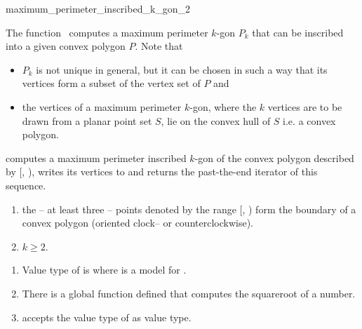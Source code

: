 \begin{ccRefFunction}{maximum_perimeter_inscribed_k_gon_2}
  
  \ccDefinition The function \ccRefName\ computes a maximum perimeter
  $k$-gon $P_k$ that can be inscribed into a given convex polygon $P$.
  Note that
  \begin{itemize}
  \item $P_k$ is not unique in general, but it can be chosen in such a
    way that its vertices form a subset of the vertex set of $P$ and
  \item the vertices of a maximum perimeter $k$-gon, where the $k$
    vertices are to be drawn from a planar point set $S$, lie on the
    convex hull of $S$ i.e. a convex polygon.
  \end{itemize}


  \def\ccLongParamLayout{\ccTrue}
  
  computes a maximum perimeter inscribed $k$-gon of the convex polygon
  described by [, ), writes its
  vertices to  and returns the past-the-end iterator of this
  sequence.

  \ccPrecond
  \begin{enumerate}
  \item the -- at least three -- points denoted by the range
    [, ) form the boundary of a
    convex polygon (oriented clock-- or counterclockwise).
  \item $k \ge 2$.
  \end{enumerate}

  \ccRequire
  \begin{enumerate}
  \item Value type of  is 
    where  is a model for .
  \item There is a global function 
    defined that computes the squareroot of a number.
  \item {} accepts the value type of
     as value type.
  \end{enumerate}


\end{ccRefFunction}
